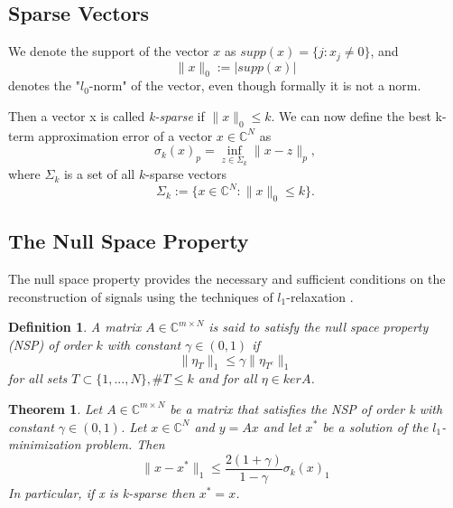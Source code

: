 \documentclass[
  english,        %
  font=times,     %
  onecolumn,      %
]{tumarticle}
\newtheorem{definition}{Definition}[section]
\newtheorem{theorem}{Theorem}[section]
\numberwithin{equation}{section} %
\begin{document}
\begin{large}
\begin{adjustwidth}{0pt}{0pt}
\subsection{Sparse Vectors}

We denote the support of the vector $x$ as $supp(x) = \{j : x_j \neq 0\}$, and 
\[ \lVert x \rVert_0 := |supp(x)| \]
denotes the "$l_0$-norm" of the vector, even though formally it is not a norm.

Then a vector x is called \textit{k-sparse} if $\lVert x \rVert_0 \leq k$. We can now define the best k-term approximation error of a vector $x \in \mathbb{C}^N$ as
\[ \sigma_k (x)_p = \inf_{z \in \Sigma_k} \lVert x - z \rVert_p, \]
where $\Sigma_k$ is a set of all $k$-sparse vectors
\[\Sigma_k := \{x \in \mathbb{C}^N : \lVert x \rVert_0 \leq k\}. \]

\subsection{The Null Space Property}

The null space property provides the necessary and sufficient conditions on the reconstruction of signals using the techniques of $l_1$-relaxation \cite{CSKA}.
\begin{definition}
A matrix $A \in \mathbb{C}^{m \times N}$ is said to satisfy the null space property (NSP) of order $k$ with constant $\gamma \in (0, 1)$ if
\[ \lVert \eta_T \rVert_1 \leq \gamma \lVert  \eta_{T^c} \rVert_1 \]
for all sets $T \subset \{1,...,N\}, \#T \leq k$ and for all $\eta \in ker A$.
\end{definition}

\begin{theorem}
Let $A \in \mathbb{C}^{m \times N}$ be a matrix that satisfies the NSP of order k with constant $\gamma \in (0, 1)$. Let $x \in \mathbb{C}^N$ and $y = Ax$ and let $x^*$ be a solution of the $l_1$-minimization problem. Then
\[ \lVert x - x^* \rVert_1 \leq \frac{2(1+\gamma)}{1-\gamma} \sigma_k(x)_1 \]
In particular, if x is k-sparse then $x^* = x$.
\end{theorem}


\end{adjustwidth}
\end{large}
\end{document}
